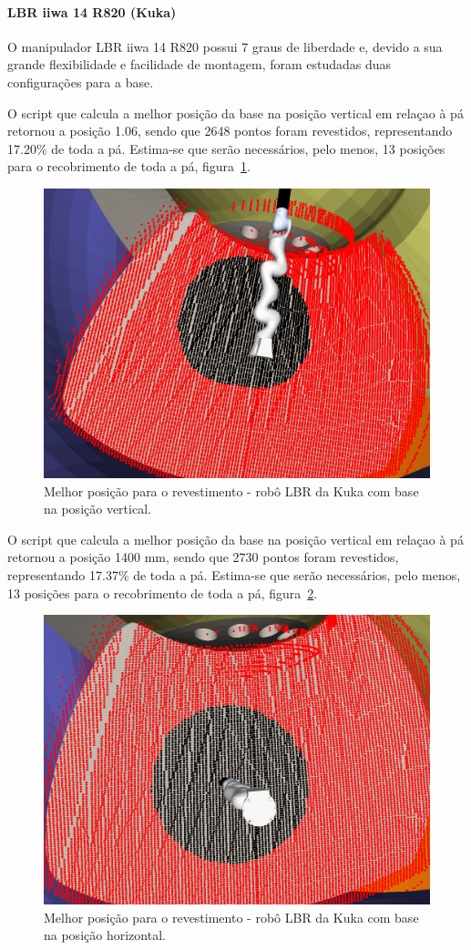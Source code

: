 \paragraph{LBR iiwa 14 R820 (Kuka)}
O manipulador LBR iiwa 14 R820 possui 7 graus de liberdade e, devido a sua
grande flexibilidade e facilidade de montagem, foram estudadas duas
configurações para a base.

O script que calcula a melhor posição da base na posição vertical em relaçao à
pá retornou a posição 1.06, sendo que 2648 pontos foram revestidos,
representando 17.20\% de toda a pá. Estima-se que serão necessários, pelo menos,
13 posições para o recobrimento de toda a pá, figura~\ref{fig::lbrbestposv}.

\begin{figure}[h!]	
	\centering
	\includegraphics[width=0.7\columnwidth]{detail/figs/bighatch/lbr_bestposv.png}
	\caption{Melhor posição para o revestimento - robô LBR da Kuka com base na
	posição vertical.}
	\label{fig::lbrbestposv}
\end{figure}

O script que calcula a melhor posição da base na posição vertical em relaçao à
pá retornou a posição 1400 mm, sendo que 2730 pontos foram revestidos,
representando 17.37\% de toda a pá. Estima-se que serão necessários, pelo menos,
13 posições para o recobrimento de toda a pá, figura~\ref{fig::lbrbestposh}.

\begin{figure}[h!]	
	\centering
	\includegraphics[width=0.7\columnwidth]{detail/figs/bighatch/lbr_bestposh.png}
	\caption{Melhor posição para o revestimento - robô LBR da Kuka com base na
	posição horizontal.}
	\label{fig::lbrbestposh}
\end{figure}

